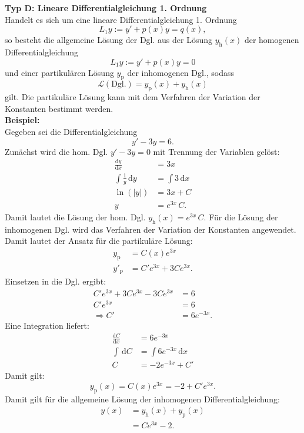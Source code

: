 \noindent
\textbf{Typ D: Lineare Differentialgleichung 1. Ordnung}\\
Handelt es sich um eine lineare Differentialgleichung 1. Ordnung
$$
L_1 y:= y' +p(x)y = q(x),
$$
so besteht die allgemeine L\"osung der Dgl. aus der L\"osung $y_{\text{h}}(x)$ der homogenen Differentialgleichung
$$
L_1 y := y' +p(x)y = 0
$$
und einer partikul\"aren L\"osung $y_{\text{p}}$ der inhomogenen Dgl.,
sodass
$$
\mathcal{L}(\text{Dgl.}) = y_{\text{p}}(x) + y_{\text{h}}(x)
$$
gilt. Die partikul\"are L\"osung kann mit dem Verfahren der Variation der Konstanten bestimmt werden.\\

\noindent
\textbf{Beispiel:} \\
Gegeben sei die Differentialgleichung
$$
y'-3y=6.
$$
Zun\"achst wird die hom. Dgl. $y'-3y=0$ mit Trennung der Variablen gel\"ost:
\begin{align*}
\frac{\mathrm{d}y}{\mathrm{d}x} &= 3x \\
\int \frac{1}{y} \, \mathrm{d}y &= \int 3 \, \mathrm{d}x \\
\ln(|y|) &= 3x+C \\
y &= e^{3x} \, C.
\end{align*}
Damit lautet die L\"osung der hom. Dgl. $y_{\text{h}}(x)= e^{3x} \, C$.
F\"ur die L\"osung der inhomogenen Dgl. wird das Verfahren der Variation der Konstanten angewendet. Damit lautet der Ansatz f\"ur die partikul\"are L\"osung:
\begin{align*}
y_{\text{p}} &= C(x) e^{3x} \\
y'_{\text{p}} &= C' e^{3x} + 3 C e^{3x}.
\end{align*}
Einsetzen in die Dgl. ergibt:
\begin{align*}
C' e^{3x} + 3 C e^{3x} - 3Ce^{3x}  &= 6 \\
C' e^{3x} &= 6 \\
\Rightarrow C' &= 6 e^{-3x}. 
\end{align*}
Eine Integration liefert:
\begin{align*}
\frac{\mathrm{d}C}{\mathrm{d}x} &= 6 e^{-3x} \\
\int  \, \mathrm{d}C &= \int 6 e^{-3x} \, \mathrm{d}x \\
C &= -2 e^{-3x} + C'
\end{align*}
Damit gilt:
$$
y_{\text{p}}(x) = C(x) e^{3x} = -2 + C' e^{3x}.
$$
Damit gilt f\"ur die allgemeine L\"osung der inhomogenen Differentialgleichung:
\begin{align*}
y(x) &=  y_{\text{h}}(x) + y_{\text{p}}(x)\\
     &= C e^{3x} -2.
\end{align*}

